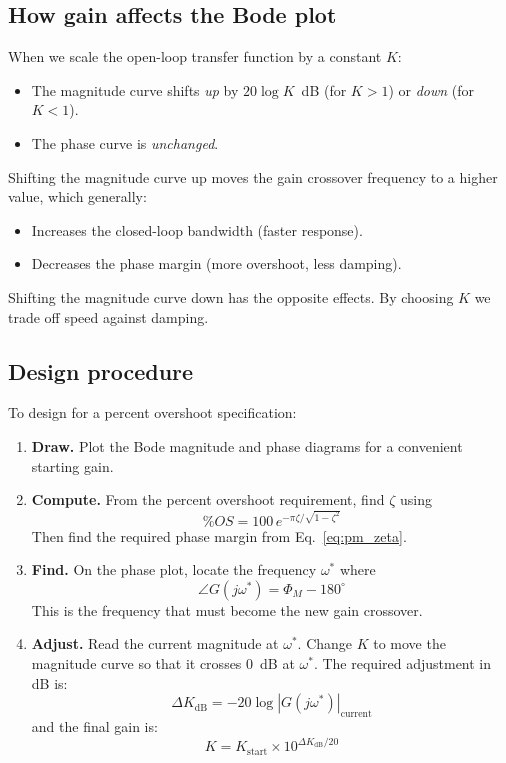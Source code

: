 \documentclass[12pt]{article}
\begin{document}
\subsection{How gain affects the Bode plot}
\label{sec:gain_effect}

When we scale the open-loop transfer function by a constant $K$:
\begin{itemize}
  \item The magnitude curve shifts \emph{up} by $20\log K$~dB (for $K > 1$)
    or \emph{down} (for $K < 1$).
  \item The phase curve is \emph{unchanged}.
\end{itemize}

Shifting the magnitude curve up moves the gain crossover frequency to a
higher value, which generally:
\begin{itemize}
  \item Increases the closed-loop bandwidth (faster response).
  \item Decreases the phase margin (more overshoot, less damping).
\end{itemize}
Shifting the magnitude curve down has the opposite effects.  By choosing $K$
we trade off speed against damping.

\subsection{Design procedure}
\label{sec:procedure}

To design for a percent overshoot specification:

\begin{enumerate}
  \item \textbf{Draw.}  Plot the Bode magnitude and phase diagrams for a
    convenient starting gain.
  \item \textbf{Compute.}  From the percent overshoot requirement, find $\zeta$
    using
    \[
      \%OS = 100\,e^{-\pi\zeta/\sqrt{1-\zeta^2}}
    \]
    Then find the required phase margin from Eq.~\eqref{eq:pm_zeta}.
  \item \textbf{Find.}  On the phase plot, locate the frequency $\omega^*$
    where
    \[
      \angle G(j\omega^*) = \Phi_M - 180^\circ
    \]
    This is the frequency that must become the new gain crossover.
  \item \textbf{Adjust.}  Read the current magnitude at $\omega^*$.  Change
    $K$ to move the magnitude curve so that it crosses 0~dB at $\omega^*$.
    The required adjustment in dB is:
    \[
      \Delta K_{\mathrm{dB}} = -20\log|G(j\omega^*)|_{\mathrm{current}}
    \]
    and the final gain is:
    \[
      K = K_{\mathrm{start}} \times 10^{\Delta K_{\mathrm{dB}}/20}
    \]
\end{enumerate}
\end{document}
